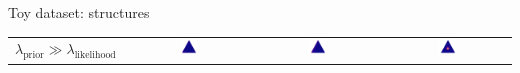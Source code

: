 \documentclass[usenames,dvipsnames,11pt,pdf,utf8,russian,aspectratio=169]{beamer}
\begin{document}
\begin{frame}{Toy dataset: structures}
\begin{table}
\begin{tabular}{cccc}
          $\lambda_\text{prior} \gg \lambda_\text{likelihood}$   & \includegraphics[width=0.15\textwidth]{triangle_0_2kld.png} & \includegraphics[width=0.15\textwidth]{triangle_1kld.png} & \includegraphics[width=0.15\textwidth]{triangle_10kld.png}\\
        \end{tabular}


    \end{table}
    
    
\end{frame}
\end{document}
